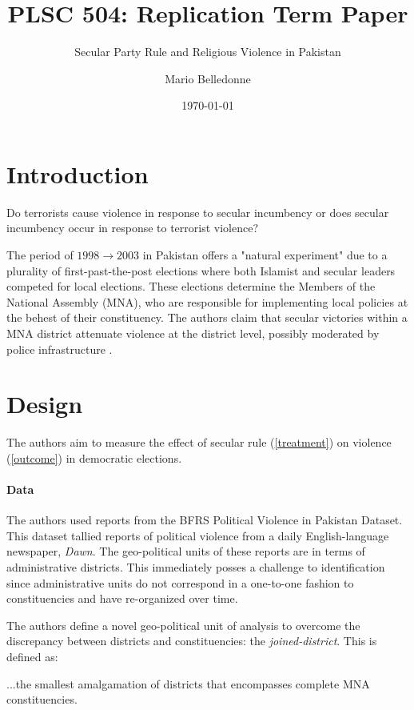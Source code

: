 \documentclass{scrartcl}
\title{PLSC 504: Replication Term Paper}
\subtitle{Secular Party Rule and Religious Violence in Pakistan}
\author{Mario Belledonne}
\date{\today}
\begin{document}
\maketitle

\section{Introduction}

Do terrorists cause violence in response to secular incumbency or does secular incumbency occur in response to terrorist violence?

The period of $1998 \rightarrow 2003$ in Pakistan offers a "natural experiment" due to a plurality of first-past-the-post elections where both Islamist and secular leaders competed for local elections.
These elections determine the Members of the National Assembly (MNA), who are responsible for implementing local policies at the behest of their constituency.
The authors claim that secular victories within a MNA district attenuate violence at the district level, possibly moderated by police infrastructure \cite{nellis_siddiqui_2018}. 

\section{Design} \label{design}


The authors aim to measure the effect of secular rule (\ref{treatment}) on violence (\ref{outcome}) in democratic elections.

\paragraph{Data} \label{data}

The authors used reports from the BFRS Political Violence in Pakistan Dataset. This dataset tallied reports of political violence from a daily English-language newspaper, \textit{Dawn}. The geo-political units of these reports are in terms of administrative districts. This immediately posses a challenge to identification since administrative units do not correspond in a one-to-one fashion to constituencies and have re-organized over time.

The authors define a novel geo-political unit of analysis to overcome the discrepancy between districts and constituencies: the \textit{joined-district}. 
This is defined as:
\begin{displayquote}
  ...the smallest amalgamation of districts that encompasses complete MNA constituencies. 
\end{displayquote}
\end{document}
